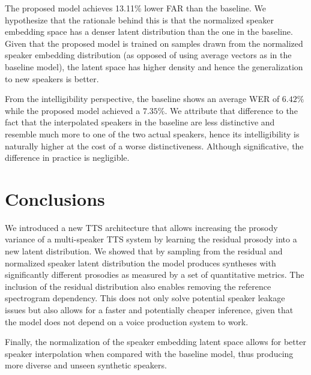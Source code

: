 The proposed model achieves 13.11\% lower FAR than the baseline. We hypothesize that the rationale behind this is that the normalized speaker embedding space has a denser latent distribution than the one in the baseline. Given that the proposed model is trained on samples drawn from the normalized speaker embedding distribution (as opposed of using average vectors as in the baseline model), the latent space has higher density and hence the generalization to new speakers is better.



From the intelligibility perspective, the baseline shows an average WER of $6.42\%$ while the proposed model achieved a $7.35\%$. We attribute that difference to the fact that the interpolated speakers in the baseline are less distinctive and resemble much more to one of the two actual speakers, hence its intelligibility is naturally higher at the cost of a worse distinctiveness. Although significative, the difference in practice is negligible.


\section{Conclusions}


We introduced a new TTS architecture that allows increasing the prosody variance of a multi-speaker TTS system by learning the residual prosody into a new latent distribution. We showed that by sampling from the residual and normalized speaker latent distribution the model produces syntheses with significantly different prosodies as measured by a set of quantitative metrics. The inclusion of the residual distribution also enables removing the reference spectrogram dependency. This does not only solve potential speaker leakage issues but also allows for a faster and potentially cheaper inference, given that the model does not depend on a voice production system to work.


Finally, the normalization of the speaker embedding latent space allows for better speaker interpolation when compared with the baseline model, thus producing more diverse and unseen synthetic speakers.


